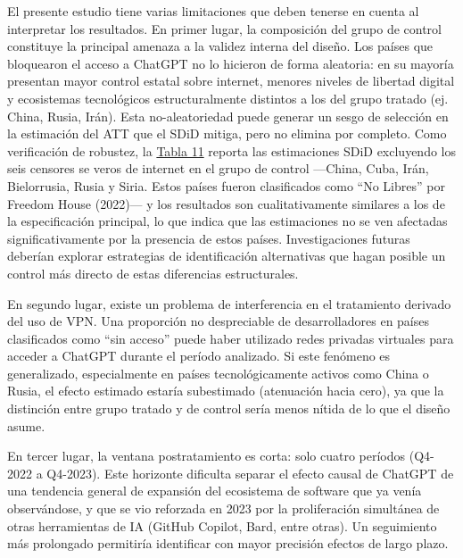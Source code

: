 \documentclass[12pt,a4paper]{article}
\begin{document}
El presente estudio tiene varias limitaciones que deben tenerse en cuenta al interpretar los resultados. En primer lugar, la composición del grupo de control constituye la principal amenaza a la validez interna del diseño. Los países que bloquearon el acceso a ChatGPT no lo hicieron de forma aleatoria: en su mayoría presentan mayor control estatal sobre internet, menores niveles de libertad digital y ecosistemas tecnológicos estructuralmente distintos a los del grupo tratado (ej. China, Rusia, Irán). Esta no-aleatoriedad puede generar un sesgo de selección en la estimación del ATT que el SDiD mitiga, pero no elimina por completo. Como verificación de robustez, la \hyperref[tab:tabla5]{Tabla 11} reporta las estimaciones SDiD excluyendo los seis censores se veros de internet en el grupo de control ---China, Cuba, Irán, Bielorrusia, Rusia y Siria. Estos países fueron clasificados como ``No Libres'' por Freedom House (2022)--- y los resultados son cualitativamente similares a los de la especificación principal, lo que indica que las estimaciones no se ven afectadas significativamente por la presencia de estos países. Investigaciones futuras deberían explorar estrategias de identificación alternativas que hagan posible un control más directo de estas diferencias estructurales.

En segundo lugar, existe un problema de interferencia en el tratamiento derivado del uso de VPN. Una proporción no despreciable de desarrolladores en países clasificados como ``sin acceso'' puede haber utilizado redes privadas virtuales para acceder a ChatGPT durante el período analizado. Si este fenómeno es generalizado, especialmente en países tecnológicamente activos como China o Rusia, el efecto estimado estaría subestimado (atenuación hacia cero), ya que la distinción entre grupo tratado y de control sería menos nítida de lo que el diseño asume.

En tercer lugar, la ventana postratamiento es corta: solo cuatro períodos (Q4-2022 a Q4-2023). Este horizonte dificulta separar el efecto causal de ChatGPT de una tendencia general de expansión del ecosistema de software que ya venía observándose, y que se vio reforzada en 2023 por la proliferación simultánea de otras herramientas de IA (GitHub Copilot, Bard, entre otras). Un seguimiento más prolongado permitiría identificar con mayor precisión efectos de largo plazo.
\end{document}
